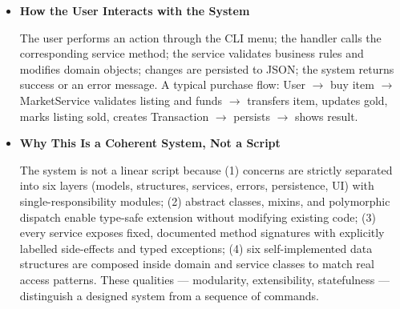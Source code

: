 \documentclass[11pt,a4paper]{article}
\begin{document}
\begin{itemize}
\vspace{1\baselineskip}
(4) Exception Hierarchy Layer (\texttt{src/errors/})

A three-level custom exception tree rooted at \texttt{TradingSystemError}, with three intermediate categories (\texttt{DataError}, \texttt{ValidationError}, \texttt{TradeError}) and 20 concrete exception classes. Service layer only raises; UI layer translates to user-friendly messages via a single \texttt{except TradingSystemError} handler.

\vspace{1\baselineskip}
(5) Persistence Layer (\texttt{data/})

Stores state in five JSON files (\texttt{players.json}, \texttt{items.json}, \texttt{market.json}, \texttt{transactions.json}, \texttt{catalog.json}). On first run the system seeds a realistic dataset; subsequent runs load and update the existing data, with automatic backups before destructive operations.

\vspace{1\baselineskip}
(6) User Interaction Layer (\texttt{src/ui/})

A command-line interface organised into domain-specific handlers (\texttt{PlayerHandler}, \texttt{ItemHandler}, \texttt{InventoryHandler}, \texttt{MarketHandler}, \texttt{ReportHandler}, \texttt{DataHandler}), driven by a central \texttt{TradingCLI} router. Validates input, calls service methods, catches typed exceptions, and formats output for the console.

\vspace{1\baselineskip}
    \item \textbf{How the User Interacts with the System}

The user performs an action through the CLI menu; the handler calls the corresponding service method; the service validates business rules and modifies domain objects; changes are persisted to JSON; the system returns success or an error message. A typical purchase flow: User \(\rightarrow\) buy item \(\rightarrow\) MarketService validates listing and funds \(\rightarrow\) transfers item, updates gold, marks listing sold, creates Transaction \(\rightarrow\) persists \(\rightarrow\) shows result.

\vspace{1\baselineskip}
    \item \textbf{Why This Is a Coherent System, Not a Script}

The system is not a linear script because (1) concerns are strictly separated into six layers (models, structures, services, errors, persistence, UI) with single-responsibility modules; (2) abstract classes, mixins, and polymorphic dispatch enable type-safe extension without modifying existing code; (3) every service exposes fixed, documented method signatures with explicitly labelled side-effects and typed exceptions; (4) six self-implemented data structures are composed inside domain and service classes to match real access patterns. These qualities — modularity, extensibility, statefulness — distinguish a designed system from a sequence of commands.

\end{itemize}
\end{document}
